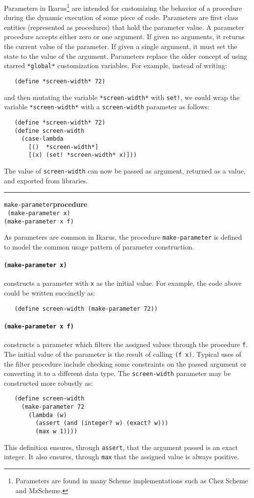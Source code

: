 \documentclass[onecolumn, 12pt, twoside, openright, dvipdfm]{book}
\makeatletter
\newcommand{\idxlabeldefun}[5]{
\vspace{1ex}
\rule{\textwidth}{2pt}
{\phantomsection\index{#1@\texttt{#2}}\label{#3}{\Large\texttt{#4}}\hfill\textbf{#5}}\\}
\newcommand{\idxdefun}[3]{\idxlabeldefun{#1}{#2}{#1}{#2}{#3}}
\newcommand{\defun}[2]{\idxdefun{#1}{#1}{#2}}
\makeatother
\begin{document}
Parameters in Ikarus\footnote{Parameters are found in many Scheme
implementations such as Chez Scheme and MzScheme.} are intended for
customizing the behavior of a procedure during the dynamic execution
of some piece of code.  Parameters are first class entities
(represented as procedures) that hold the parameter value.  A
parameter procedure accepts either zero or one argument.  If given
no arguments, it returns the current value of the parameter.  If
given a single argument, it must set the state to the value of the
argument.  Parameters replace the older concept of using starred
\texttt{*global*} customization variables.  For example, instead of
writing:
\begin{verbatim}
   (define *screen-width* 72)
\end{verbatim}
and then mutating the variable \texttt{*screen-width*} with
\texttt{set!}, we could wrap the variable \texttt{*screen-width*} with a 
\texttt{screen-width} parameter as follows:
\begin{verbatim}
   (define *screen-width* 72)
   (define screen-width 
     (case-lambda
       [()  *screen-width*]
       [(x) (set! *screen-width* x)]))
\end{verbatim}

The value of \texttt{screen-width} can now be passed as argument,
returned as a value, and exported from libraries.

\defun{make-parameter}{procedure}
\texttt{
(make-parameter x)\\
(make-parameter x f)
}

As parameters are common in Ikarus, the procedure
\texttt{make-parameter} is defined to model the common usage pattern
of parameter construction. 

\paragraph{\texttt{(make-parameter x)}} constructs a parameter
with \texttt{x} as the initial value.  For example, the code above
could be written succinctly as:
\begin{verbatim}
   (define screen-width (make-parameter 72))
\end{verbatim}

\paragraph{\texttt{(make-parameter x f)}} constructs a parameter
which filters the assigned values through the procedure \texttt{f}.
The initial value of the parameter is the result of calling
\texttt{(f~x)}.  Typical uses of the filter procedure include
checking some constraints on the passed argument or converting it to
a different data type.  The \texttt{screen-width} parameter may be
constructed more robustly as:
\begin{verbatim}
   (define screen-width 
     (make-parameter 72
       (lambda (w)
         (assert (and (integer? w) (exact? w)))
         (max w 1))))
\end{verbatim}
This definition ensures, through \texttt{assert}, that the argument
passed is an exact integer.  It also ensures, through \texttt{max}
that the assigned value is always positive.
\end{document}
